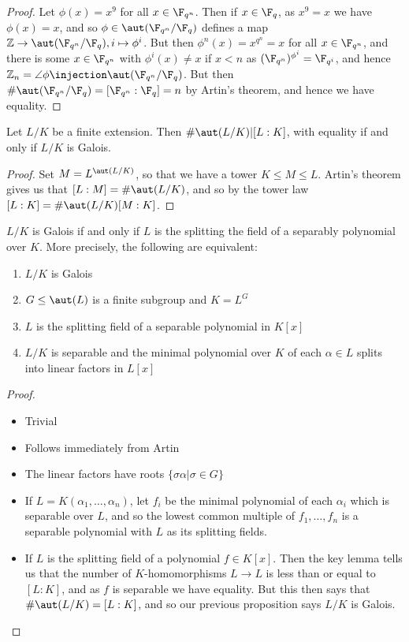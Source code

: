 \documentclass[a4paper, 10pt, twocolumn]{amsart}
\begin{document}
\begin{proof}
Let $\phi(x) = x^9$ for all $x \in \F_{q^n}$. Then if $x \in \F_q$, as $x^9 = x$ we have $\phi(x) = x$, and so $\phi \in \aut(\F_{q^n}/\F_q)$ defines a map $\mathbb{Z} \to \aut(\F_{q^n}/\F_q), i \mapsto \phi^i$. But then $\phi^n(x) = x^{q^n} = x$ for all $x \in \F_{q^n}$, and there is some $x \in \F_{q^n}$ with $\phi^i(x) \neq x$ if $x < n$ as $(\F_{q^n})^{\phi^i} = \F_{q^i}$, and hence $\mathbb{Z}_n = \angle{\phi} \injection \aut(\F_{q^n}/\F_q)$. But then $\#\aut(\F_{q^n}/\F_q) = [\F_{q^n} : \F_q] = n$ by Artin's theorem, and hence we have equality.
\end{proof}

\begin{proposition}
Let $L/K$ be a finite extension. Then $\#\aut(L/K) | [L:K]$, with equality if and only if $L/K$ is Galois.
\end{proposition}
\begin{proof}
Set $M = L^{\aut(L/K)}$, so that we have a tower $K \leq M \leq L$. Artin's theorem gives us that $[L:M] = \#\aut(L/K)$, and so by the tower law $[L:K] = \#\aut(L/K)[M:K]$.
\end{proof}
\begin{theorem}
$L/K$ is Galois if and only if $L$ is the splitting the field of a separably polynomial over $K$. More precisely, the following are equivalent:
\begin{enumerate}
\item $L/K$ is Galois
\item $G \leq \aut(L)$ is a finite subgroup and $K = L^G$
\item $L$ is the splitting field of a separable polynomial in $K[x]$
\item $L/K$ is separable and the minimal polynomial over $K$ of each $\alpha \in L$ splits into linear factors in $L[x]$
\end{enumerate}
\end{theorem}
\begin{proof}\item
\begin{itemize}
\item[\Longrightarrow{1}{2}] Trivial
\item[\Longrightarrow{2}{1}] Follows immediately from Artin
\item[\Longrightarrow{2}{4}] The linear factors have roots $\{\sigma\alpha | \sigma \in G\}$
\item[\Longrightarrow{4}{3}] If $L=K(\alpha_1, \ldots, \alpha_n)$, let $f_i$ be the minimal polynomial of each $\alpha_i$ which is separable over $L$, and so the lowest common multiple of $f_1, \ldots, f_n$ is a separable polynomial with $L$ as its splitting fields.
\item[\Longrightarrow{3}{1}] If $L$ is the splitting field of a polynomial $f \in K[x]$. Then the key lemma tells us that the number of $K$-homomorphisms $L \to L$ is less than or equal to $[L:K]$, and as $f$ is separable we have equality. But this then says that $\#\aut(L/K)=[L:K]$, and so our previous proposition says $L/K$ is Galois.
\end{itemize}
\end{proof}
\end{document}
